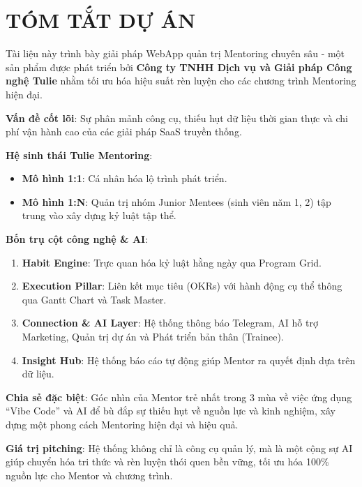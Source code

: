 \chapter*{TÓM TẮT DỰ ÁN}

Tài liệu này trình bày giải pháp WebApp quản trị Mentoring chuyên sâu - một sản phẩm được phát triển bởi \textbf{Công ty TNHH Dịch vụ và Giải pháp Công nghệ Tulie} nhằm tối ưu hóa hiệu suất rèn luyện cho các chương trình Mentoring hiện đại.

\textbf{Vấn đề cốt lõi}: Sự phân mảnh công cụ, thiếu hụt dữ liệu thời gian thực và chi phí vận hành cao của các giải pháp SaaS truyền thống.

\textbf{Hệ sinh thái Tulie Mentoring}:
\begin{itemize}
  \item \textbf{Mô hình 1:1}: Cá nhân hóa lộ trình phát triển.
  \item \textbf{Mô hình 1:N}: Quản trị nhóm Junior Mentees (sinh viên năm 1, 2) tập trung vào xây dựng kỷ luật tập thể.
\end{itemize}

\textbf{Bốn trụ cột công nghệ \& AI}:
\begin{enumerate}
  \item \textbf{Habit Engine}: Trực quan hóa kỷ luật hằng ngày qua Program Grid.
  \item \textbf{Execution Pillar}: Liên kết mục tiêu (OKRs) với hành động cụ thể thông qua Gantt Chart và Task Master.
  \item \textbf{Connection \& AI Layer}: Hệ thống thông báo Telegram, AI hỗ trợ Marketing, Quản trị dự án và Phát triển bản thân (Trainee).
  \item \textbf{Insight Hub}: Hệ thống báo cáo tự động giúp Mentor ra quyết định dựa trên dữ liệu.
\end{enumerate}

\textbf{Chia sẻ đặc biệt}: Góc nhìn của Mentor trẻ nhất trong 3 mùa về việc ứng dụng ``Vibe Code'' và AI để bù đắp sự thiếu hụt về nguồn lực và kinh nghiệm, xây dựng một phong cách Mentoring hiện đại và hiệu quả.

\textbf{Giá trị pitching}: Hệ thống không chỉ là công cụ quản lý, mà là một cộng sự AI giúp chuyển hóa tri thức và rèn luyện thói quen bền vững, tối ưu hóa 100\% nguồn lực cho Mentor và chương trình.
